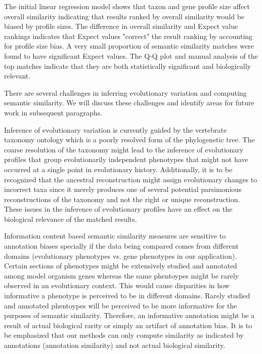 \documentclass{article}
\begin{document}
 
The initial linear regression model shows that taxon and gene profile size affect overall similarity indicating that results ranked by overall similarity would be biased by profile sizes. The difference in overall similarity and Expect value rankings indicates that Expect values "correct" the result ranking by accounting for profile size bias. A very small proportion of semantic similarity matches were found to have significant Expect values. The Q-Q plot and manual analysis of the top matches indicate that they are both statistically significant and biologically relevant.




There are several challenges in inferring evolutionary variation and computing semantic similarity. We will discuss these challenges and identify areas for future work in subsequent paragraphs. 

Inference of evolutionary variation is currently guided by the vertebrate taxonomy ontology which is a poorly resolved form of the phylogenetic tree. The coarse resolution of the taxonomy might lead to the inference of evolutionary profiles that group evolutionarily independent phenotypes that might not have occurred at a single point in evolutionary history. Additionally, it is to be recognized that the ancestral reconstruction might assign evolutionary changes to incorrect taxa since it merely produces one of several potential parsimonious reconstructions of the taxonomy and not the right or unique reconstruction. These issues in the inference of evolutionary profiles have an effect on the biological relevance of the matched results. 

Information content based semantic similarity measures are sensitive to annotation biases specially if the data being compared comes from different domains (evolutionary phenotypes vs. gene phenotypes in our application). Certain sections of phenotypes might be extensively studied and annotated among model organism genes whereas the same phentoypes might be rarely observed in an evolutionary context. This would cause disparities in how informative a phenotype is perceived to be in different domains. Rarely studied and annotated phentoypes will be perceived to be more informative for the purposes of semantic similarity. Therefore, an informative annotation might be a result of actual biological rarity or simply an artifact of annotation bias. It is to be emphasized that our methods can only compute similarity as indicated by annotations (annotation similarity) and not actual biological similarity.
\end{document}
